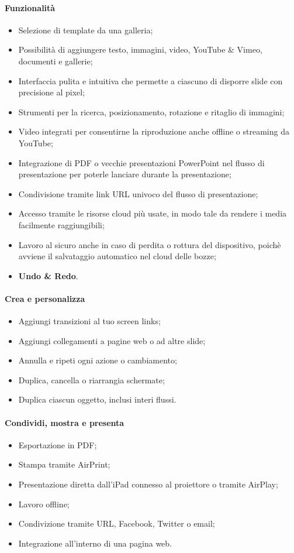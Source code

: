 \paragraph{Funzionalità}
\begin{itemize}
 \item Selezione di template da una galleria;
 \item Possibilità di aggiungere testo, immagini, video, YouTube \& Vimeo, documenti e gallerie;
 \item Interfaccia pulita e intuitiva che permette a ciascuno di disporre slide con precisione al pixel;
 \item Strumenti per la ricerca, posizionamento, rotazione e ritaglio di immagini;
 \item Video integrati per consentirne la riproduzione anche offline o streaming da YouTube;
 \item Integrazione di PDF o vecchie presentazioni PowerPoint nel flusso di presentazione per poterle lanciare durante la presentazione;
 \item Condivisione tramite link URL univoco del flusso di presentazione;
 \item Accesso tramite le risorse cloud più usate, in modo tale da rendere i media facilmente raggiungibili;
 \item Lavoro al sicuro anche in caso di perdita o rottura del dispositivo, poichè avviene il salvataggio automatico nel cloud delle bozze;
 \item \textbf{Undo \& Redo}.
\end{itemize}
\paragraph{Crea e personalizza}
\begin{itemize}
\item Aggiungi transizioni al tuo screen links;
\item Aggiungi collegamenti a pagine web o ad altre slide;
\item Annulla e ripeti ogni azione o cambiamento;
\item Duplica, cancella o riarrangia schermate;
\item Duplica ciascun oggetto, inclusi interi flussi.
\end{itemize}
\paragraph{Condividi, mostra e presenta}
\begin{itemize}
\item Esportazione in PDF;
\item Stampa tramite AirPrint;
\item Presentazione diretta dall'iPad connesso al proiettore o tramite AirPlay;
\item Lavoro offline;
\item Condivizione tramite URL, Facebook, Twitter o email;
\item Integrazione all'interno di una pagina web.
\end{itemize}

